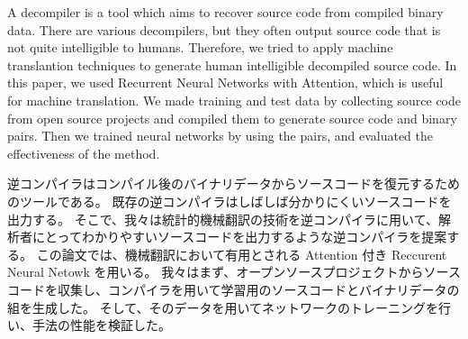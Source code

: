 \documentclass[senior,final,11pt]{iscs-thesis}
\date{December 11, 2018}
\begin{document}
\begin{eabstract}
A decompiler is a tool which aims to recover source code from compiled binary data.
There are various decompilers, but they often output source code that is not quite intelligible to humans. 
Therefore, we tried to apply machine translantion techniques to generate human intelligible decompiled source code. 
In this paper, we used Recurrent Neural Networks with Attention, which is useful for machine translation. 
We made training and test data by collecting source code from open source projects and compiled them to generate source code and binary pairs. 
Then we trained neural networks by using the pairs, and evaluated the effectiveness of the method.
\end{eabstract}
\begin{jabstract}
逆コンパイラはコンパイル後のバイナリデータからソースコードを復元するためのツールである。
既存の逆コンパイラはしばしば分かりにくいソースコードを出力する。
そこで、我々は統計的機械翻訳の技術を逆コンパイラに用いて、解析者にとってわかりやすいソースコードを出力するような逆コンパイラを提案する。
この論文では、機械翻訳において有用とされる Attention 付き Reccurent Neural Netowk を用いる。
我々はまず、オープンソースプロジェクトからソースコードを収集し、コンパイラを用いて学習用のソースコードとバイナリデータの組を生成した。
そして、そのデータを用いてネットワークのトレーニングを行い、手法の性能を検証した。
\end{jabstract}

\maketitle
\end{document}
